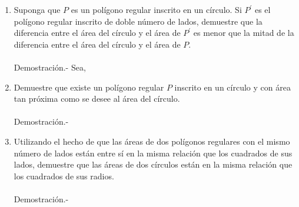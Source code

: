\begin{enumerate}[\bfseries 1.]
\begin{enumerate}[\bfseries (a)]
	    \item Suponga que $P$ es un polígono regular inscrito en un círculo. Si $P^{'}$ es el polígono regular inscrito de doble número de lados, demuestre que la diferencia entre el área del círculo y el área de $P^{'}$ es menor que la mitad de la diferencia entre el área del círculo y el área de $P$.\\\\
		Demostración.-\; Sea,
		\begin{center}
		\end{center}
		\vspace{.5cm}

	    \item Demuestre que existe un polígono regular $P$ inscrito en un círculo y con área tan próxima como se desee al área del círculo.\\\\
		Demostración.-\;

	    \item Utilizando el hecho de que las áreas de dos polígonos regulares con el mismo número de lados están entre sí en la misma relación que los cuadrados de sus lados, demuestre que las áreas de dos círculos están en la misma relación que los cuadrados de sus radios.\\\\
		Demostración.-\;

	\end{enumerate}

\end{enumerate}

